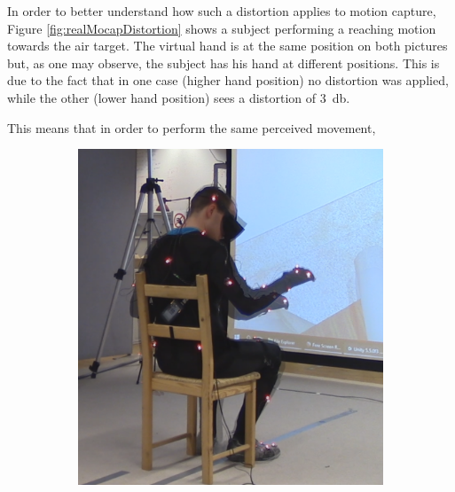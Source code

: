 In order to better understand how such a distortion applies to motion capture, Figure \ref{fig:realMocapDistortion} shows a subject performing a reaching motion towards the air target. The virtual hand is at the same position on both pictures but, as one may observe, the subject has his hand at different positions. This is due to the fact that in one case (higher hand position) no distortion was applied, while the other (lower hand position) sees a distortion of \SI{3}{\decibel}.

This means that in order to perform the same perceived movement, 

\begin{figure}[h]
    \centering
    \begin{subfigure}[b]{.3\textwidth}
        \includegraphics[width=\textwidth]{Figures/handPositionTwice.png}
    \end{subfigure}
    ~
    \begin{subfigure}[b]{.3\textwidth}

\end{subfigure}
\end{figure}
